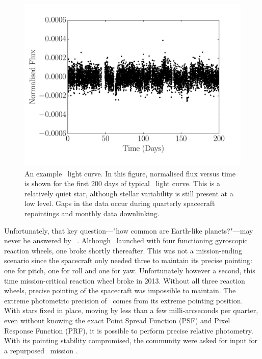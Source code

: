 \begin{figure}[p]
\begin{center}
\includegraphics[width=6in, clip=true]{figures/demo_kepler_lightcurve.pdf}
\caption[An example \kepler\ light curve.]
{An example \kepler\ light curve.
In this figure, normalised flux versus time is shown for the first 200 days
of typical \kepler\ light curve.
This is a relatively quiet star, although stellar variability is still present
at a low level.
Gaps in the data occur during quarterly spacecraft repointings and monthly
data downlinking.}
\label{fig:current_fields}
\end{center}
\end{figure}

Unfortunately, that key question---"how common are Earth-like planets?"---may
never be answered by \kepler\ \citep[or at least not very precisely, several
inferences have been performed by extrapolation, \eg][]{Petigura2013,
Foreman-Mackey2014, Burke2015}.
Although \kepler\ launched with four functioning gyroscopic reaction wheels,
one broke shortly thereafter.
This was not a mission-ending scenario since the spacecraft only needed three
to maintain its precise pointing: one for pitch, one for roll and one for yaw.
Unfortunately however a second, this time mission-critical reaction wheel
broke in 2013.
Without all three reaction wheels, precise pointing of the spacecraft was
impossible to maintain.
The extreme photometric precision of \kepler\ comes from its extreme pointing
position.
With stars fixed in place, moving by less than a few milli-arcseconds per
quarter, even without knowing the exact Point Spread Function (PSF) and Pixel
Response Function (PRF), it is possible to perform precise relative
photometry.
With its pointing stability compromised, the community were asked for input
for a repurposed \kepler\ mission \citep[\eg][]{Hogg2013, Aigrain2015}.

